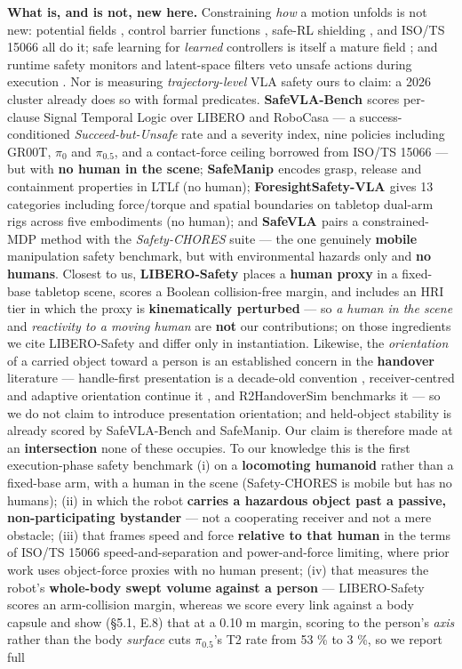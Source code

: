 \textbf{What is, and is not, new here.} Constraining \emph{how} a motion unfolds is not new: potential fields \citep{ref8}, control barrier functions \citep{ref9}, safe-RL shielding \citep{ref10}, and ISO/TS 15066 \citep{ref11} all do it; safe learning for \emph{learned} controllers is itself a mature field \citep{ref16}; and runtime safety monitors and latent-space filters veto unsafe actions during execution \citep{ref17,ref18}. Nor is measuring \emph{trajectory-level} VLA safety ours to claim: a 2026 cluster already does so with formal predicates. \textbf{SafeVLA-Bench \citep{ref27}} scores per-clause Signal Temporal Logic over LIBERO and RoboCasa --- a success-conditioned \emph{Succeed-but-Unsafe} rate and a severity index, nine policies including GR00T, $\pi_0$ and $\pi_{0.5}$, and a contact-force ceiling borrowed from ISO/TS 15066 --- but with \textbf{no human in the scene}; \textbf{SafeManip \citep{ref30}} encodes grasp, release and containment properties in LTLf (no human); \textbf{ForesightSafety-VLA \citep{ref23}} gives 13 categories including force/torque and spatial boundaries on tabletop dual-arm rigs across five embodiments (no human); and \textbf{SafeVLA \citep{ref21}} pairs a constrained-MDP method with the \emph{Safety-CHORES} suite --- the one genuinely \textbf{mobile} manipulation safety benchmark, but with environmental hazards only and \textbf{no humans}. Closest to us, \textbf{LIBERO-Safety \citep{ref24}} places a \textbf{human proxy} in a fixed-base tabletop scene, scores a Boolean collision-free margin, and includes an HRI tier in which the proxy is \textbf{kinematically perturbed} --- so \emph{a human in the scene} and \emph{reactivity to a moving human} are \textbf{not} our contributions; on those ingredients we cite LIBERO-Safety and differ only in instantiation. Likewise, the \emph{orientation} of a carried object toward a person is an established concern in the \textbf{handover} literature --- handle-first presentation is a decade-old convention \citep{ref53,ref55}, receiver-centred and adaptive orientation continue it \citep{ref32,ref33}, and R2HandoverSim benchmarks it \citep{ref34} --- so we do not claim to introduce presentation orientation; and held-object stability is already scored by SafeVLA-Bench and SafeManip. Our claim is therefore made at an \textbf{intersection} none of these occupies. To our knowledge this is the first execution-phase safety benchmark (i) on a \textbf{locomoting humanoid} rather than a fixed-base arm, with a human in the scene (Safety-CHORES \citep{ref21} is mobile but has no humans); (ii) in which the robot \textbf{carries a hazardous object past a passive, non-participating bystander} --- not a cooperating receiver and not a mere obstacle; (iii) that frames speed and force \textbf{relative to that human} in the terms of ISO/TS 15066 speed-and-separation and power-and-force limiting, where prior work uses object-force proxies with no human present; (iv) that measures the robot's \textbf{whole-body swept volume against a person} --- LIBERO-Safety scores an arm-collision margin, whereas we score every link against a body capsule and show (\S5.1, E.8) that at a 0.10 m margin, scoring to the person's \emph{axis} rather than the body \emph{surface} cuts $\pi_{0.5}$'s T2 rate from 53 \% to 3 \%, so we report full 